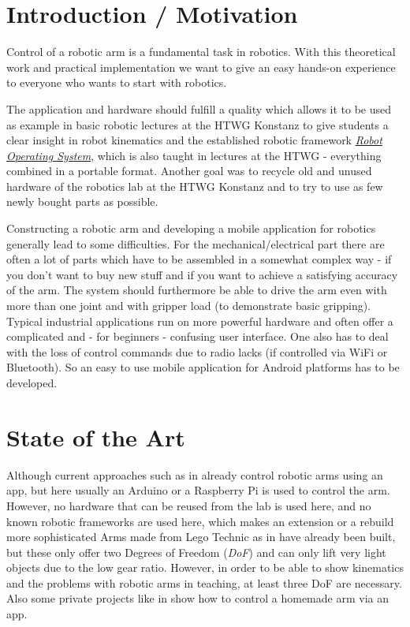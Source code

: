 \documentclass[conference]{IEEEtran}
\begin{document}
\section{Introduction / Motivation}
Control of a robotic arm is a fundamental task in robotics. With this theoretical work and practical implementation we want to give an easy hands-on experience to everyone who wants to start with robotics.\\
\par
The application and hardware should fulfill a quality which allows it to be used as example in basic robotic lectures at the HTWG Konstanz to give students a clear insight in robot kinematics and the established robotic framework \href{http://www.ros.org/}{\textit{Robot Operating System}}, which is also taught in lectures at the HTWG - everything combined in a portable format. 
Another goal was to recycle old and unused hardware of the robotics lab at the HTWG Konstanz and to try to use as few newly bought parts as possible.
\\
\par
Constructing a robotic arm and developing a mobile application for robotics generally lead to some difficulties.
For the mechanical/electrical part there are often a lot of parts which have to be assembled in a somewhat complex way - if you don't want to buy new stuff and if you want to achieve a satisfying accuracy of the arm. The system should furthermore be able to drive the arm even with more than one joint and with gripper load (to demonstrate basic gripping).
Typical industrial applications run on more powerful hardware and often offer a complicated and - for beginners - confusing user interface. One also has to deal with the loss of control commands due to radio lacks (if controlled via WiFi or Bluetooth). So an easy to use mobile application for Android platforms has to be developed. 

\section{State of the Art}
Although current approaches such as in \cite{onlIEEEApp-Arm} already control robotic arms using an app, but here usually an Arduino or a Raspberry Pi is used to control the arm. However, no hardware that can be reused from the lab is used here, and no known robotic frameworks are used here, which makes an extension or a rebuild more sophisticated Arms made from Lego Technic as in \cite{onlNXT-2DOF} have already been built, but these only offer two Degrees of Freedom (\textit{DoF}) and can only lift very light objects due to the low gear ratio. However, in order to be able to show kinematics and the problems with robotic arms in teaching, at least three DoF are necessary.
Also some private projects like in \cite{onlHackster} show how to control a homemade arm via an app.
\end{document}
